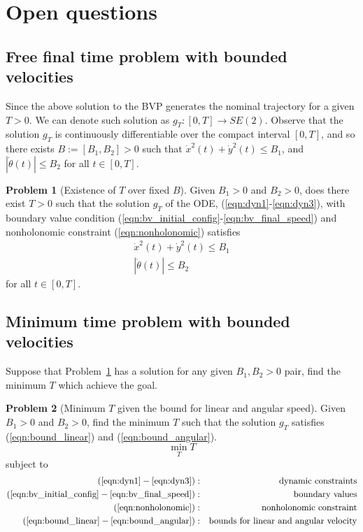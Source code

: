 \documentclass[letterpaper, 11 pt, onecolumn]{ieeeconf}  %
\theoremstyle{definition}
\newtheorem{prob}{Problem}
\begin{document}
 
\section{Open questions}
 
\subsection{Free final time problem with bounded velocities}

Since the above solution to the BVP generates the nominal trajectory for a given $T>0$. We can denote such solution as $g_T: [0,T]\to SE(2)$. Observe that the solution $g_T$ is continuously differentiable over the compact interval $[0,T]$, and so there exists $B:=[B_1, B_2]>0$ such that $\dot{x}^2(t)+\dot{y}^2(t) \leq B_1$, and $|\dot{\theta}(t)|\leq B_2$ for all $t\in[0,T]$. 

\begin{prob}[Existence of $T$ over fixed $B$]
\label{prbo:existence_T}
 Given $B_1>0$ and $B_2>0$, does there exist $T>0$ such that the solution $g_T$ of the ODE, (\ref{eqn:dyn1}-\ref{eqn:dyn3}), with boundary value condition (\ref{eqn:bv_initial_config}-\ref{eqn:bv_final_speed}) and nonholonomic constraint (\ref{eqn:nonholonomic}) satisfies
\begin{eqnarray}
\label{eqn:bound_linear}
\dot{x}^2(t)+\dot{y}^2(t)\leq B_1
\\
\label{eqn:bound_angular}
|\dot{\theta}(t)|\leq B_2
\end{eqnarray}
for all $t\in[0,T]$.
\end{prob}

\subsection{Minimum time problem with bounded velocities}
Suppose that Problem~\ref{prbo:existence_T} has a solution for any given $B_1, B_2>0$ pair, find the minimum $T$ which achieve the goal. 

\begin{prob}[Minimum $T$ given the bound for linear and angular speed]
\label{prbo:minimum_T}
Given $B_1>0$ and $B_2>0$, find the minimum $T$ such that the solution $g_T$ satisfies (\ref{eqn:bound_linear}) and (\ref{eqn:bound_angular}). 
\begin{equation*} 
\min_{T} T
\end{equation*}
subject to 
\begin{eqnarray*}
(\ref{eqn:dyn1}-\ref{eqn:dyn3}) &:&\text{dynamic constraints}
\\
(\ref{eqn:bv_initial_config}-\ref{eqn:bv_final_speed}) &:&\text{boundary values}
\\
(\ref{eqn:nonholonomic}) &:&\text{nonholonomic constraint}
\\
(\ref{eqn:bound_linear}-\ref{eqn:bound_angular}) &:&\text{bounds for linear and angular velocity}
\end{eqnarray*}
\end{prob}
\end{document}
